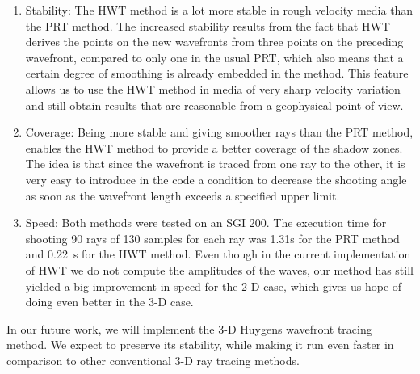 \begin{enumerate}
\item  Stability: The HWT method is a lot more stable in rough
velocity media than the PRT method. The increased stability results
from the fact that HWT derives the points on the new wavefronts from 
three points on the preceding wavefront, compared to only one in the
usual PRT, which also means that a certain degree of smoothing is already
embedded in the method. This feature allows us to use the HWT
method in media of very sharp velocity variation and still
obtain results that are reasonable from a geophysical point of view.

\item  Coverage: Being more stable and giving smoother rays than the PRT
method, enables the HWT method to provide a better coverage of
the shadow zones. The idea is that since the wavefront is traced from one
ray to the other, it is very easy to introduce in the code a condition
to decrease the shooting angle as soon as the wavefront length exceeds
a specified upper limit.

\item Speed: Both methods were tested on an SGI 200. The execution time
for shooting 90 rays of 130 samples for each ray was 1.31s for the PRT method
and \mbox{0.22 s} for the HWT method. Even though in the current implementation
of HWT we do not compute the amplitudes of the waves, our method has
still yielded a big improvement in speed for the 2-D case, which gives us
hope of doing even better in the 3-D case. 
\end{enumerate}
\par
In our future work, we will implement the 3-D Huygens wavefront tracing
method. We expect to preserve its stability, while making it run even
faster in comparison to other conventional 3-D ray tracing methods.


 


%
%
